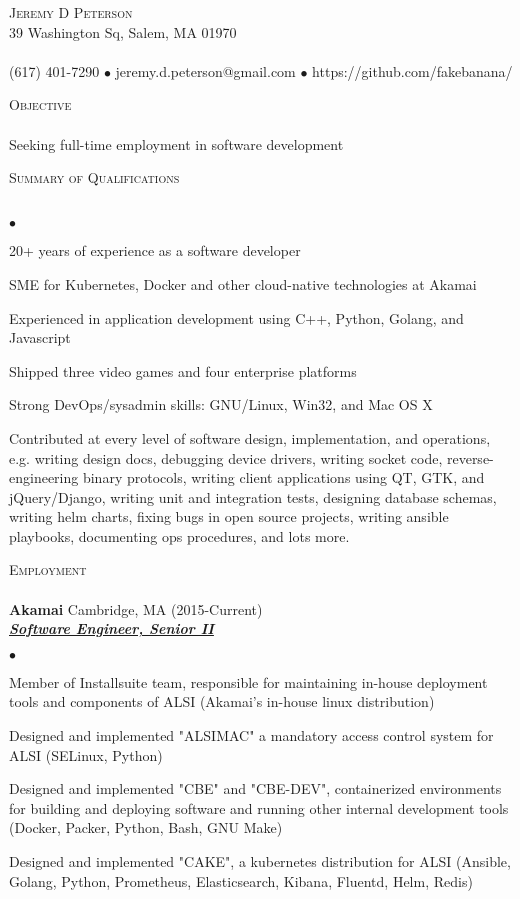 \documentclass{article}
\newcommand{\lineunder}{\vspace*{-8pt} \\ \hspace*{-18pt} \hrulefill \\}
\newcommand{\header}[1]{{\hspace*{-15pt}\vspace*{6pt} \textsc{#1}} \vspace*{-6pt} \lineunder}
\newcommand{\employer}[4]{{ \textbf{#1} #2 (#3)\\ \underline{\textbf{\emph{#4}}}\\  }}
\newcommand{\contact}[3]{
\vspace*{-8pt}
\begin{center}
{\LARGE \scshape {#1}}\\
#2 \lineunder 
#3
\end{center}
\vspace*{-8pt}
}
\newcommand{\objective}[1]{{ #1\vspace*{8pt} }}
\newenvironment{achievements}{\begin{list}{$\bullet$}{\topsep 0pt \itemsep -2pt}}{\vspace*{4pt}\end{list}}
\begin{document}
\small
\smallskip
\vspace*{-80pt}

\contact{Jeremy D Peterson}
{39 Washington Sq, Salem, MA 01970}
{(617) 401-7290 $\bullet$ jeremy.d.peterson@gmail.com  $\bullet$ https://github.com/fakebanana/ }

\header{Objective}
\objective {Seeking full-time employment in software development}

\header{Summary of Qualifications}
\begin{achievements}
\item 20+ years of experience as a software developer
\item SME for Kubernetes, Docker and other cloud-native technologies at Akamai
\item Experienced in application development using C++, Python, Golang, and Javascript
\item Shipped three video games and four enterprise platforms
\item Strong DevOps/sysadmin skills: GNU/Linux, Win32, and Mac OS X
\item Contributed at every level of software design, implementation, and operations, e.g. writing design docs, debugging device drivers, writing socket code, reverse-engineering binary protocols, writing client applications using QT, GTK, and jQuery/Django, writing unit and integration tests, designing database schemas, writing helm charts, fixing bugs in open source projects, writing ansible playbooks, documenting ops procedures, and lots more.
\end{achievements}

\header{Employment}

	\employer{Akamai} {Cambridge, MA} {2015-Current} {Software Engineer, Senior II}
	\begin{achievements}
	\item Member of Installsuite team, responsible for maintaining in-house deployment tools and components of ALSI (Akamai's in-house linux distribution)
	\item Designed and implemented "ALSIMAC" a mandatory access control system for ALSI (SELinux, Python)
	\item Designed and implemented "CBE" and "CBE-DEV", containerized environments for building and deploying software and running other internal development tools (Docker, Packer, Python, Bash, GNU Make)
	\item Designed and implemented "CAKE", a kubernetes distribution for ALSI (Ansible, Golang, Python, Prometheus, Elasticsearch, Kibana, Fluentd, Helm, Redis)
	\end{achievements}
\end{document}
